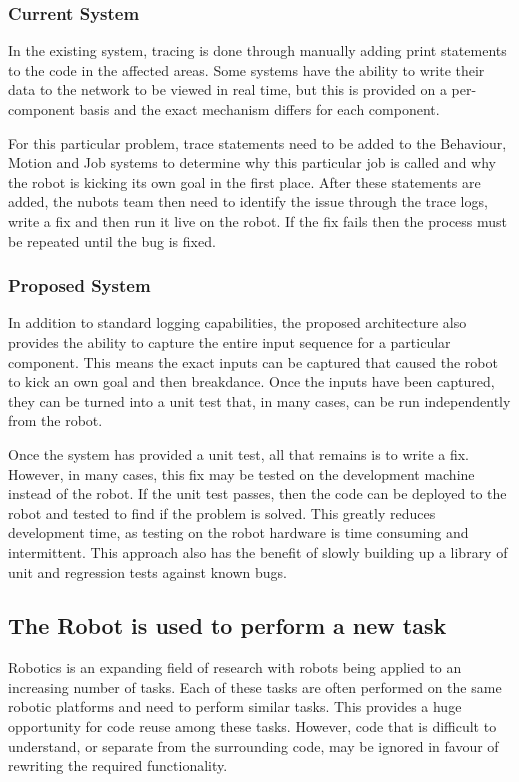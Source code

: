 \documentclass[english,12pt]{scrartcl}
\begin{document}
			\subsubsection{Current System}
				In the existing system, tracing is done through manually adding print statements to the code in the affected areas.
				Some systems have the ability to write their data to the network to be viewed in real time, but this is provided on a per-component basis and the exact mechanism differs for each component.
				
				For this particular problem, trace statements need to be added to the Behaviour, Motion and Job systems to determine why this particular job is called and why the robot is kicking its own goal in the first place.
				After these statements are added, the \gls{nubots} team then need to identify the issue through the trace logs, write a fix and then run it live on the robot. If the fix fails then the process must be repeated until the bug is fixed.
				
			\subsubsection{Proposed System}
				In addition to standard logging capabilities, the proposed architecture also provides the ability to capture the entire input sequence for a particular component.
				This means the exact inputs can be captured that caused the robot to kick an own goal and then breakdance.
				Once the inputs have been captured, they can be turned into a unit test that, in many cases, can be run independently from the robot.
				
				Once the system has provided a unit test, all that remains is to write a fix.
				However, in many cases, this fix may be tested on the development machine instead of the robot.
				If the unit test passes, then the code can be deployed to the robot and tested to find if the problem is solved.
				This greatly reduces development time, as testing on the robot hardware is time consuming and intermittent.
				This approach also has the benefit of slowly building up a library of unit and regression tests against known bugs.

		\subsection{The Robot is used to perform a new task}
			Robotics is an expanding field of research with robots being applied to an increasing number of tasks.
			Each of these tasks are often performed on the same robotic platforms and need to perform similar tasks.
			This provides a huge opportunity for code reuse among these tasks.
			However, code that is difficult to understand, or separate from the surrounding code, may be ignored in favour of rewriting the required functionality.
\end{document}
